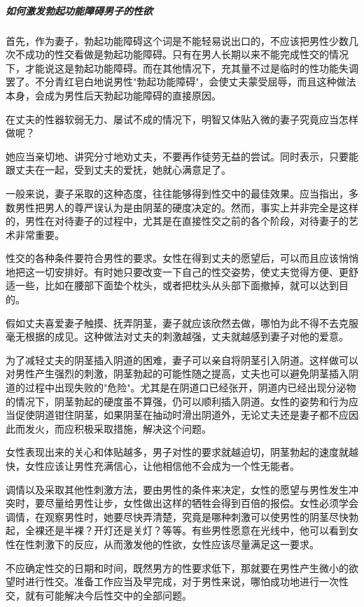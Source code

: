 \subparagraph{如何激发勃起功能障碍男子的性欲}

首先，作为妻子，勃起功能障碍这个词是不能轻易说出口的，不应该把男性少数几次不成功的性交看做是勃起功能障碍。只有在男人长期以来不能完成性交的情况下，才能说这是勃起功能障碍。而在其他情况下，充其量不过是临时的性功能失调罢了。不分青红皂白地说男性"勃起功能障碍"，会使丈夫蒙受屈辱，而且这种做法本身，会成为男性后天勃起功能障碍的直接原因。

在丈夫的性器软弱无力、屡试不成的情况下，明智又体贴入微的妻子究竟应当怎样做呢？

她应当亲切地、讲究分寸地劝丈夫，不要再作徒劳无益的尝试。同时表示，只要能跟丈夫在一起，受到丈夫的爱抚，她就心满意足了。

一般来说，妻子采取的这种态度，往往能够得到性交中的最佳效果。应当指出，多数男性把男人的尊严误认为是由阴茎的硬度决定的。然而，事实上并非完全是这样的，男性在对待妻子的过程中，尤其是在直接性交之前的各个阶段，对待妻子的艺术非常重要。

性交的各种条件要符合男性的要求。女性在得到丈夫的愿望后，可以而且应该悄悄地把这一切安排好。有时她只要改变一下自己的性交姿势，使丈夫觉得方便、更舒适一些，比如在腰部下面垫个枕头，或者把枕头从头部下面撤掉，就可以达到目的。

假如丈夫喜爱妻子触摸、抚弄阴茎，妻子就应该欣然去做，哪怕为此不得不去克服毫无根据的成见。这种做法对丈夫的刺激越强，丈夫就越感到妻子对他的爱意。

为了减轻丈夫的阴茎插入阴道的困难，妻子可以亲自将阴茎引入阴道。这样做可以对男性产生强烈的刺激，阴茎勃起的可能性随之提高，丈夫也可以避免阴茎插入阴道的过程中出现失败的"危险"。尤其是在阴道口已经张开，阴道内已经出现分泌物的情况下，阴茎勃起的硬度虽不算强，仍可以顺利插入阴道。女性的姿势和行为应当促使阴道钳住阴茎，如果阴茎在抽动时滑出阴道外，无论丈夫还是妻子都不应因此而发火，而应积极采取措施，解决这个问题。

女性表现出来的关心和体贴越多，男子对性的要求就越迫切，阴茎勃起的速度就越快，女性应该让男性充满信心，让他相信他不会成为一个性无能者。

调情以及采取其他性刺激方法，要由男性的条件来决定，女性的愿望与男性发生冲突时，要尽量给男性让步，女性做出这样的牺牲会得到百倍的报偿。女性必须学会调情，在观察男性时，她要尽快弄清楚，究竟是哪种刺激可以使男性的阴茎尽快勃起，全裸还是半裸？开灯还是关灯？等等。有些男性愿意在光线中，他可以看到女性在性刺激下的反应，从而激发他的性欲，女性应该尽量满足这一要求。

不应确定性交的日期和时间，既然男方的性要求低下，那就要在男性产生微小的欲望时进行性交。准备工作应当及早完成，对于男性来说，哪怕成功地进行一次性交，就有可能解决今后性交中的全部问题。

